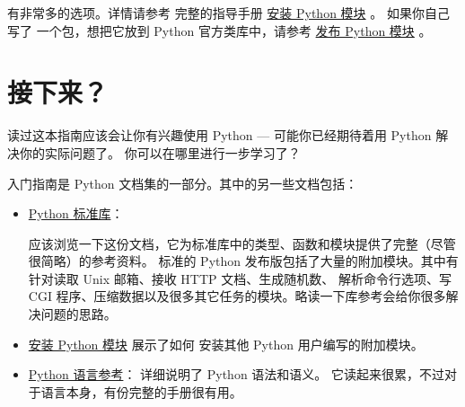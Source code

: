 \documentclass[a4paper,10pt,english]{sphinxmanual}
\begin{document}
 有非常多的选项。详情请参考  完整的指导手册 \href{https://docs.python.org/3/installing/index.html\#installing-index}{安装 Python 模块} 。 如果你自己写了
一个包，想把它放到 Python 官方类库中，请参考 \href{https://docs.python.org/3/distributing/index.html\#distributing-index}{发布 Python 模块} 。


\chapter{接下来？}
\label{whatnow:id4}\label{whatnow:tut-whatnow}\label{whatnow::doc}\label{whatnow:id1}
读过这本指南应该会让你有兴趣使用 Python --- 可能你已经期待着用 Python 解决你的实际问题了。
你可以在哪里进行一步学习了？

入门指南是 Python 文档集的一部分。其中的另一些文档包括：
\begin{itemize}
\item {} 
\href{https://docs.python.org/3/library/index.html\#library-index}{Python 标准库}：

应该浏览一下这份文档，它为标准库中的类型、函数和模块提供了完整（尽管很简略）的参考资料。
标准的 Python 发布版包括了大量的附加模块。其中有针对读取 Unix 邮箱、接收 HTTP 文档、生成随机数、
解析命令行选项、写 CGI 程序、压缩数据以及很多其它任务的模块。略读一下库参考会给你很多解决问题的思路。

\item {} 
\href{https://docs.python.org/3/installing/index.html\#installing-index}{安装 Python 模块} 展示了如何
安装其他 Python 用户编写的附加模块。

\item {} 
\href{https://docs.python.org/3/reference/index.html\#reference-index}{Python 语言参考}： 详细说明了 Python 语法和语义。
它读起来很累，不过对于语言本身，有份完整的手册很有用。

\end{itemize}
\end{document}
